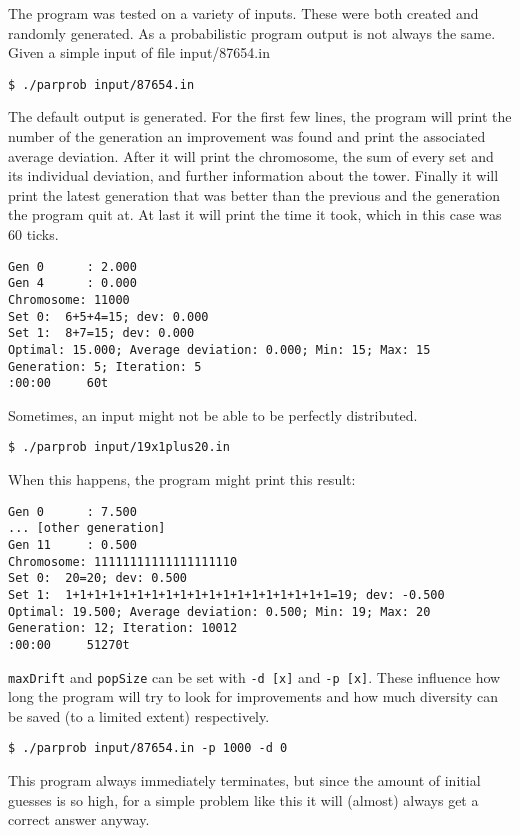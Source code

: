 \documentclass[a4paper,10pt]{article}
\begin{document}
The program was tested on a variety of inputs. These were both created and randomly generated.
As a probabilistic program output is not always the same.
\newline
\newline
Given a simple input of file input/87654.in
\begin{lstlisting}[style = stdio]
$ ./parprob input/87654.in
\end{lstlisting}
The default output is generated. For the first few lines, the program will print the number of the generation an improvement was found and print the associated average deviation.
After it will print the chromosome, the sum of every set and its individual deviation, and further information about the tower. Finally it will print the latest generation that was better than the previous and the generation the program quit at. At last it will print the time it took, which in this case was 60 ticks.
\begin{lstlisting}[style = stdio]
Gen 0      : 2.000
Gen 4      : 0.000
Chromosome: 11000
Set 0:  6+5+4=15; dev: 0.000
Set 1:  8+7=15; dev: 0.000
Optimal: 15.000; Average deviation: 0.000; Min: 15; Max: 15
Generation: 5; Iteration: 5
:00:00     60t
\end{lstlisting}
Sometimes, an input might not be able to be perfectly distributed.
\begin{lstlisting}[style = stdio]
$ ./parprob input/19x1plus20.in
\end{lstlisting}
When this happens, the program might print this result:
\begin{lstlisting}[style = stdio]
Gen 0      : 7.500
... [other generation]
Gen 11     : 0.500
Chromosome: 11111111111111111110
Set 0:  20=20; dev: 0.500
Set 1:  1+1+1+1+1+1+1+1+1+1+1+1+1+1+1+1+1+1+1=19; dev: -0.500
Optimal: 19.500; Average deviation: 0.500; Min: 19; Max: 20
Generation: 12; Iteration: 10012
:00:00     51270t
\end{lstlisting}
{\tt maxDrift} and {\tt popSize} can be set with {\tt -d [x]} and {\tt -p [x]}. These influence how long the program will try to look for improvements and how much diversity can be saved (to a limited extent) respectively.
\begin{lstlisting}[style = stdio]
$ ./parprob input/87654.in -p 1000 -d 0
\end{lstlisting}
This program always immediately terminates, but since the amount of initial guesses is so high, for a simple problem like this it will (almost) always get a correct answer anyway. 
\newline
\end{document}

